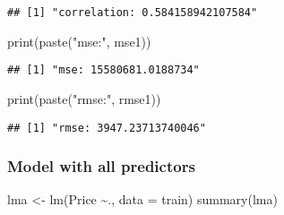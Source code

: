 \documentclass[
]{article}
\newenvironment{Shaded}{\begin{snugshade}}{\end{snugshade}}
\newcommand{\AttributeTok}[1]{\textcolor[rgb]{0.77,0.63,0.00}{#1}}
\newcommand{\FunctionTok}[1]{\textcolor[rgb]{0.00,0.00,0.00}{#1}}
\newcommand{\NormalTok}[1]{#1}
\newcommand{\OtherTok}[1]{\textcolor[rgb]{0.56,0.35,0.01}{#1}}
\newcommand{\SpecialCharTok}[1]{\textcolor[rgb]{0.00,0.00,0.00}{#1}}
\newcommand{\StringTok}[1]{\textcolor[rgb]{0.31,0.60,0.02}{#1}}
\begin{document}
\begin{verbatim}
## [1] "correlation: 0.584158942107584"
\end{verbatim}

\begin{Shaded}
\begin{Highlighting}[]
\FunctionTok{print}\NormalTok{(}\FunctionTok{paste}\NormalTok{(}\StringTok{"mse:"}\NormalTok{, mse1))}
\end{Highlighting}
\end{Shaded}

\begin{verbatim}
## [1] "mse: 15580681.0188734"
\end{verbatim}

\begin{Shaded}
\begin{Highlighting}[]
\FunctionTok{print}\NormalTok{(}\FunctionTok{paste}\NormalTok{(}\StringTok{"rmse:"}\NormalTok{, rmse1))}
\end{Highlighting}
\end{Shaded}

\begin{verbatim}
## [1] "rmse: 3947.23713740046"
\end{verbatim}

\hypertarget{model-with-all-predictors}{%
\subsubsection{Model with all
predictors}\label{model-with-all-predictors}}

\begin{Shaded}
\begin{Highlighting}[]
\NormalTok{lma }\OtherTok{\textless{}{-}} \FunctionTok{lm}\NormalTok{(Price }\SpecialCharTok{\textasciitilde{}}\NormalTok{., }\AttributeTok{data =}\NormalTok{ train)}
\FunctionTok{summary}\NormalTok{(lma)}
\end{Highlighting}
\end{Shaded}
\end{document}

